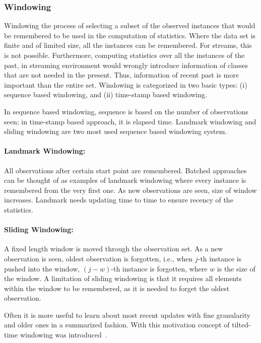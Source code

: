\documentclass[a4paper, 11pt, oneside]{book}
\begin{document}
\subsubsection{Windowing}
Windowing the process of selecting a subset of the observed instances that would be remembered to be used in the computation of statistics. Where the data set is finite and of limited size, all the instances can be remembered. For streams, this is not possible. Furthermore, computing statistics over all the instances of the past, in streaming environment would wrongly introduce information of classes that are not needed in the present. Thus, information of recent past is more important than the entire set. Windowing is categorized in two basic types: (i) sequence based windowing, and (ii) time-stamp based windowing.

In sequence based windowing, sequence is based on the number of observations seen; in time-stamp based approach, it is elapsed time. Landmark windowing and sliding windowing are two most used sequence based windowing system.

\paragraph{Landmark Windowing:} All observations after certain start point are remembered. Batched approaches can be thought of as examples of landmark windowing where every instance is remembered from the very first one. As new observations are seen, size of window increases. Landmark needs updating time to time to ensure recency of the statistics.

\paragraph{Sliding Windowing:} A fixed length window is moved through the observation set. As a new observation is seen, oldest observation is forgotten, i.e., when $j$-th instance is pushed into the window, $(j-w)$-th instance is forgotten, where $w$ is the size of the window. A limitation of sliding windowing is that it requires all elements within the window to be remembered, as it is needed to forget the oldest observation.

Often it is more useful to learn about most recent updates with fine granularity and older ones in a summarized fashion. With this motivation concept of tilted-time windowing was introduced~\cite{chen02:tiltedtime}.
\end{document}
